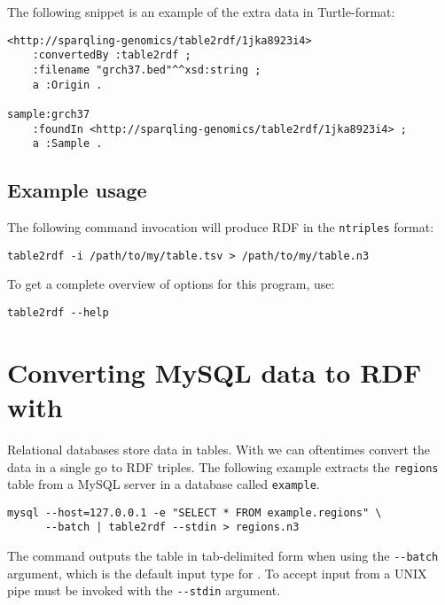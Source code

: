   The following snippet is an example of the extra data in Turtle-format:

\begin{siderules}
\begin{verbatim}
<http://sparqling-genomics/table2rdf/1jka8923i4>
    :convertedBy :table2rdf ;
    :filename "grch37.bed"^^xsd:string ;
    a :Origin .

sample:grch37
    :foundIn <http://sparqling-genomics/table2rdf/1jka8923i4> ;
    a :Sample .
\end{verbatim}
\end{siderules}

\subsection{Example usage}

The following command invocation will produce RDF in the \texttt{ntriples}
format:
\begin{siderules}
\begin{verbatim}
table2rdf -i /path/to/my/table.tsv > /path/to/my/table.n3
\end{verbatim}
\end{siderules}

To get a complete overview of options for this program, use:
\begin{siderules}
\begin{verbatim}
table2rdf --help
\end{verbatim}
\end{siderules}

\section{Converting MySQL data to RDF with }

  Relational databases store data in tables.  With  we
  can oftentimes convert the data in a single go to RDF triples.  The following
  example extracts the \texttt{regions} table from a MySQL server in a database
  called \texttt{example}.

\begin{siderules}
\begin{verbatim}
mysql --host=127.0.0.1 -e "SELECT * FROM example.regions" \
      --batch | table2rdf --stdin > regions.n3
\end{verbatim}
\end{siderules}

  The  command outputs the table in tab-delimited form when using
  the \texttt{-{}-batch} argument, which is the default input type for
  .  To accept input from a UNIX pipe \program{table2rdf} must
  be invoked with the \texttt{-{}-stdin} argument.


